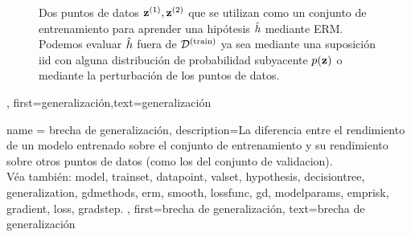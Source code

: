 {{\begin{figure}[H]
		                   	\caption{Dos puntos de datos ${\bf z}^{(1)},{\bf z}^{(2)}$ que se utilizan como un conjunto de entrenamiento
							   	para aprender una hipótesis $\hat{h}$ mediante ERM. Podemos evaluar $\hat{h}$ 
		                   		fuera de $\mathcal{D}^{(\rm train)}$ ya sea mediante una suposición iid con alguna distribución de probabilidad subyacente $p({\bf z})$ 
		                   		o mediante la perturbación de los puntos de datos.}
		                   	\label{fig:polynomial_fit_dict}
		                   \end{figure}
		                   \newpage
		},
	first={generalización},text={generalización} }

{name = {brecha de generalización}, 
	description={La diferencia entre el rendimiento de un modelo
		entrenado sobre el conjunto de entrenamiento y su rendimiento sobre otros puntos de datos
		(como los del conjunto de validacion).\\
		Véa también: \gls{model}, \gls{trainset}, \gls{datapoint}, \gls{valset}, \gls{hypothesis}, 
		\gls{decisiontree}, \gls{generalization}, \gls{gdmethods}, \gls{erm}, \gls{smooth}, 
		\gls{lossfunc}, \gls{gd}, \gls{modelparams}, \gls{emprisk}, \gls{gradient}, \gls{loss}, 
		\gls{gradstep}.
	}, 
	first={brecha de generalización}, 
	text={brecha de generalización}
}

